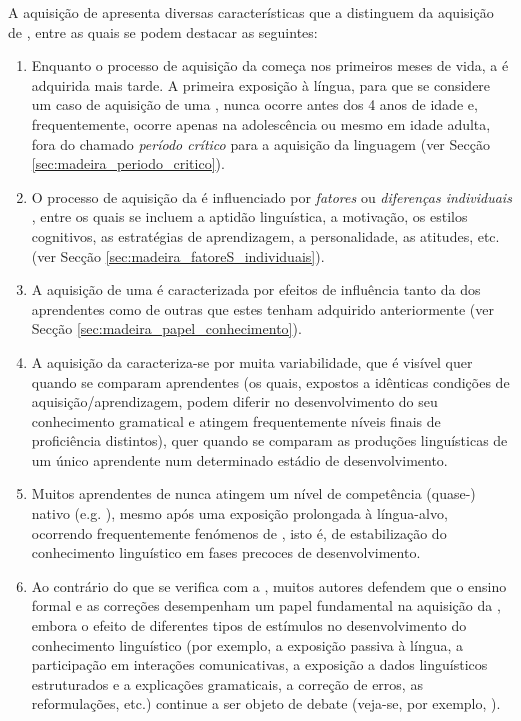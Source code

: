 \documentclass[output=paper]{LSP/langsci}
\begin{document}
A aquisição de  apresenta diversas características que a distinguem da aquisição de , entre as quais se podem destacar as seguintes: 

\begin{enumerate}
\item Enquanto o processo de aquisição da  começa nos primeiros meses de vida, a  é adquirida mais tarde. A primeira exposição à língua, para que se considere um caso de aquisição de uma , nunca ocorre antes dos 4 anos de idade \citep{schwartz2004} e, frequentemente, ocorre apenas na adolescência ou mesmo em idade adulta, fora do chamado \textit{período crítico} para a aquisição da linguagem \citep{lenneberg1967} (ver Secção \ref{sec:madeira_periodo_critico}).

\item  O processo de aquisição da  é influenciado por \textit{fatores} ou \textit{diferenças individuais} \citep{domyeiskehan2003}, entre os quais se incluem a aptidão linguística, a motivação, os estilos cognitivos, as estratégias de aprendizagem, a personalidade, as atitudes, etc. (ver Secção \ref{sec:madeira_fatoreS_individuais}).

\item A aquisição de uma  é caracterizada por efeitos de influência tanto da  dos aprendentes \citep{odlin2005} como de outras  que estes tenham adquirido anteriormente \citep{rothman_etal2013} (ver Secção \ref{sec:madeira_papel_conhecimento}).

\item A aquisição da  caracteriza-se por muita variabilidade, que é visível quer quando se comparam aprendentes (os quais, expostos a idênticas condições de aquisição/aprendizagem, podem diferir no desenvolvimento do seu conhecimento gramatical e atingem frequentemente níveis finais de proficiência distintos), quer quando se comparam as produções linguísticas de um único aprendente num determinado estádio de desenvolvimento.

\item Muitos aprendentes de  nunca atingem um nível de competência (quase-) nativo (e.g. \citealt{hylternstamabrahamsson2003}), mesmo após uma exposição prolongada à língua-alvo, ocorrendo frequentemente fenómenos de  \citep{selinker1972}, isto é, de estabilização do conhecimento linguístico em fases precoces de desenvolvimento.

\item   Ao contrário do que se verifica com a , muitos autores defendem que o ensino formal e as correções desempenham um papel fundamental na aquisição da , embora o efeito de diferentes tipos de estímulos no desenvolvimento do conhecimento linguístico (por exemplo, a exposição passiva à língua, a participação em interações comunicativas, a exposição a dados linguísticos estruturados e a explicações gramaticais, a correção de erros, as reformulações, etc.) continue a ser objeto de debate (veja-se, por exemplo, \citealt{long1996}). 

\end{enumerate}
\end{document}
